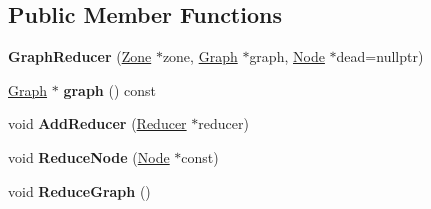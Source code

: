 \subsection*{Public Member Functions}
\begin{DoxyCompactItemize}
\item 
{\bfseries Graph\+Reducer} (\hyperlink{classv8_1_1internal_1_1_zone}{Zone} $\ast$zone, \hyperlink{classv8_1_1internal_1_1compiler_1_1_graph}{Graph} $\ast$graph, \hyperlink{classv8_1_1internal_1_1compiler_1_1_node}{Node} $\ast$dead=nullptr)\hypertarget{classv8_1_1internal_1_1compiler_1_1_graph_reducer_a234dce17c72dd0eef3e84754e0c78fbd}{}\label{classv8_1_1internal_1_1compiler_1_1_graph_reducer_a234dce17c72dd0eef3e84754e0c78fbd}

\item 
\hyperlink{classv8_1_1internal_1_1compiler_1_1_graph}{Graph} $\ast$ {\bfseries graph} () const \hypertarget{classv8_1_1internal_1_1compiler_1_1_graph_reducer_a4dbbcfada79d1ea7ce08e052703ad024}{}\label{classv8_1_1internal_1_1compiler_1_1_graph_reducer_a4dbbcfada79d1ea7ce08e052703ad024}

\item 
void {\bfseries Add\+Reducer} (\hyperlink{classv8_1_1internal_1_1compiler_1_1_reducer}{Reducer} $\ast$reducer)\hypertarget{classv8_1_1internal_1_1compiler_1_1_graph_reducer_a329d6fb23dd54f07625fce43008c2241}{}\label{classv8_1_1internal_1_1compiler_1_1_graph_reducer_a329d6fb23dd54f07625fce43008c2241}

\item 
void {\bfseries Reduce\+Node} (\hyperlink{classv8_1_1internal_1_1compiler_1_1_node}{Node} $\ast$const)\hypertarget{classv8_1_1internal_1_1compiler_1_1_graph_reducer_a29a312f60ff837b899dd53414bd69753}{}\label{classv8_1_1internal_1_1compiler_1_1_graph_reducer_a29a312f60ff837b899dd53414bd69753}

\item 
void {\bfseries Reduce\+Graph} ()\hypertarget{classv8_1_1internal_1_1compiler_1_1_graph_reducer_a5bbd1eaf3d27ed84b49d1b43e3e31958}{}\label{classv8_1_1internal_1_1compiler_1_1_graph_reducer_a5bbd1eaf3d27ed84b49d1b43e3e31958}

\end{DoxyCompactItemize}
